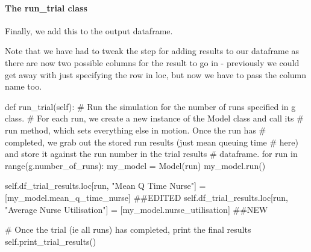 \documentclass[
  letterpaper,
  DIV=11,
  numbers=noendperiod]{scrreprt}
\let\oldparagraph\paragraph
\renewcommand{\paragraph}[1]{\oldparagraph{#1}\mbox{}}
\newenvironment{Shaded}{}{}
\newcommand{\BuiltInTok}[1]{\textcolor[rgb]{0.84,0.23,0.29}{#1}}
\newcommand{\CommentTok}[1]{\textcolor[rgb]{0.42,0.45,0.49}{#1}}
\newcommand{\ControlFlowTok}[1]{\textcolor[rgb]{0.84,0.23,0.29}{#1}}
\newcommand{\KeywordTok}[1]{\textcolor[rgb]{0.84,0.23,0.29}{#1}}
\newcommand{\NormalTok}[1]{\textcolor[rgb]{0.14,0.16,0.18}{#1}}
\newcommand{\OperatorTok}[1]{\textcolor[rgb]{0.14,0.16,0.18}{#1}}
\newcommand{\StringTok}[1]{\textcolor[rgb]{0.01,0.18,0.38}{#1}}
\newcommand{\VariableTok}[1]{\textcolor[rgb]{0.89,0.38,0.04}{#1}}
\begin{document}
\paragraph{The run\_trial class}\label{the-run_trial-class}

Finally, we add this to the output dataframe.

Note that we have had to tweak the step for adding results to our
dataframe as there are now two possible columns for the result to go in
- previously we could get away with just specifying the row in loc, but
now we have to pass the column name too.

\begin{Shaded}
\begin{Highlighting}[]
\KeywordTok{def}\NormalTok{ run\_trial(}\VariableTok{self}\NormalTok{):}
    \CommentTok{\# Run the simulation for the number of runs specified in g class.}
    \CommentTok{\# For each run, we create a new instance of the Model class and call its}
    \CommentTok{\# run method, which sets everything else in motion.  Once the run has}
    \CommentTok{\# completed, we grab out the stored run results (just mean queuing time}
    \CommentTok{\# here) and store it against the run number in the trial results}
    \CommentTok{\# dataframe.}
    \ControlFlowTok{for}\NormalTok{ run }\KeywordTok{in} \BuiltInTok{range}\NormalTok{(g.number\_of\_runs):}
\NormalTok{        my\_model }\OperatorTok{=}\NormalTok{ Model(run)}
\NormalTok{        my\_model.run()}

        \VariableTok{self}\NormalTok{.df\_trial\_results.loc[run, }\StringTok{"Mean Q Time Nurse"}\NormalTok{] }\OperatorTok{=}\NormalTok{ [my\_model.mean\_q\_time\_nurse] }\CommentTok{\#\#EDITED}
        \VariableTok{self}\NormalTok{.df\_trial\_results.loc[run, }\StringTok{"Average Nurse Utilisation"}\NormalTok{] }\OperatorTok{=}\NormalTok{ [my\_model.nurse\_utilisation] }\CommentTok{\#\#NEW}

    \CommentTok{\# Once the trial (ie all runs) has completed, print the final results}
    \VariableTok{self}\NormalTok{.print\_trial\_results()}
\end{Highlighting}
\end{Shaded}
\end{document}
